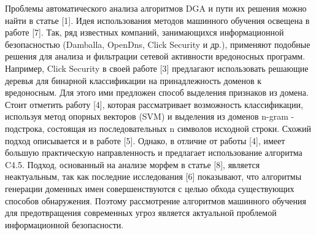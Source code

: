 Проблемы автоматического анализа алгоритмов DGA и пути их решения можно найти в статье [1]. Идея использования методов машинного обучения освещена в работе [7]. Так, ряд известных компаний, занимающихся информационной безопасностью (Damballa, OpenDns, Click Security и др.), применяют подобные решения для анализа и фильтрации сетевой активности вредоносных программ.
Например, Click Security в своей работе [3] предлагают использовать решающие деревья для бинарной классификации на принадлежность доменов к вредоносным. Для этого ими предложен способ выделения признаков из домена.
Стоит отметить работу [4], которая рассматривает возможность классификации, используя метод опорных векторов (SVM) и выделения из доменов n-gram - подстрока, состоящая из последовательных n символов исходной строки. Схожий подход описывается и в работе [5]. Однако, в отличие от работы [4], имеет большую практическую направленность и предлагает использование алгоритма C4.5.
Подход, основанный на анализе морфем в статье [8], является неактуальным, так как последние исследования [6] показывают, что алгоритмы генерации доменных имен совершенствуются с целью обхода существующих способов обнаружения.
Поэтому рассмотрение алгоритмов машинного обучения для предотвращения современных угроз является актуальной проблемой информационной безопасности.

\clearpage